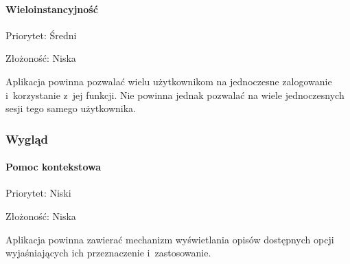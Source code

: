 \paragraph{Wieloinstancyjność\newline}
Priorytet: Średni

Złożoność: Niska

Aplikacja powinna pozwalać wielu użytkownikom na jednoczesne zalogowanie i~korzystanie z~jej funkcji. Nie powinna jednak pozwalać na wiele jednoczesnych sesji tego samego użytkownika.

\subsubsection{Wygląd}

\paragraph{Pomoc kontekstowa\newline}
Priorytet: Niski

Złożoność: Niska

Aplikacja powinna zawierać mechanizm wyświetlania opisów dostępnych opcji wyjaśniających ich przeznaczenie i~zastosowanie.
